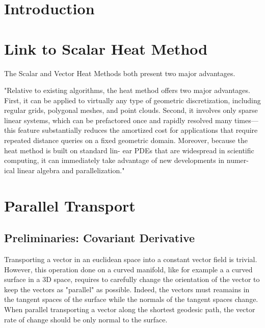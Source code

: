 \documentclass[sigconf]{acmart}
\begin{document}



\maketitle

\section{Introduction}

\section{Link to Scalar Heat Method}
The Scalar and Vector Heat Methods both present two major advantages. 

"Relative to existing algorithms, the heat method offers 
two major advantages. First, it can be applied to virtually any
type of geometric discretization, including regular grids,
polygonal meshes, and point clouds. Second, it involves
only sparse linear systems, which can be prefactored once
and rapidly resolved many times—this feature substantially
reduces the amortized cost for applications that require
repeated distance queries on a fixed geometric domain.
Moreover, because the heat method is built on standard lin-
ear PDEs that are widespread in scientific computing, it can
immediately take advantage of new developments in numer-
ical linear algebra and parallelization."

\section{Parallel Transport}

\subsection{Preliminaries: Covariant Derivative}
Transporting a vector in an euclidean space into a constant vector field is trivial. However, this operation done on a curved manifold, like for example a a curved surface in a 3D space, requires to carefully change the orientation of the vector to keep the vectors as "parallel" as possible. Indeed, the vectors must reamains in the tangent spaces of the surface while the normals of the tangent spaces change. When parallel transporting a vector along the shortest geodesic path, the vector rate of change should be only normal to the surface. 
\end{document}

